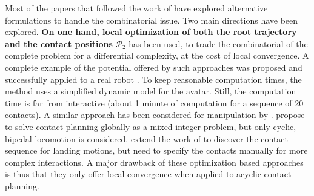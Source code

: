 Most of the papers that followed the work of \citeauthor{Bretl:2006:MPM:1124573.1124585} have explored alternative formulations to handle the combinatorial issue. Two main directions have been explored. \textbf{On one hand, local optimization of both the root trajectory \Pa and the contact positions $\mathcal{P}_2$} has been used, to trade the combinatorial of the complete problem for a differential complexity, at the cost of local convergence. A complete example of the potential offered by such approaches was proposed \citep{Mordatch:2012:DCB:2185520.2185539} and successfully applied to a real robot \citep{mordatch2015}. To keep reasonable computation times, the method uses a simplified dynamic model for the avatar. Still, the computation time is far from interactive  (about 1 minute of computation for a sequence of 20 contacts).  A similar approach has been considered for manipulation by \cite{gabicciniisrr15}. \citeauthor{DBLP:conf/humanoids/DeitsT14} propose to solve contact planning globally as a mixed integer problem, but only cyclic, bipedal locomotion is considered. 
\citeauthor{dai2014whole} extend the work of \citeauthor{Posa:2014:DMT:2568343.2568352} to discover the contact sequence for landing motions, but need to specify
the contacts manually for more complex interactions.
A major drawback of these optimization based approaches is thus that they only offer local convergence when applied to acyclic contact planning.

